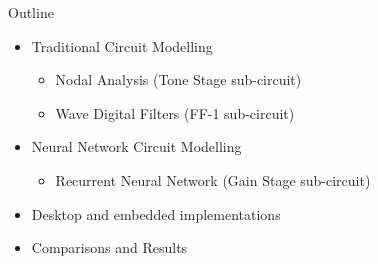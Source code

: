 \begin{frame}{Outline}
    \begin{itemize}
        \item Traditional Circuit Modelling
        \begin{itemize}
            \itemsep0em
            \item Nodal Analysis (Tone Stage sub-circuit)
            \item Wave Digital Filters (FF-1 sub-circuit)
        \end{itemize}
        \item Neural Network Circuit Modelling
        \begin{itemize}
            \itemsep0em
            \item Recurrent Neural Network (Gain Stage sub-circuit)
        \end{itemize}
        \item Desktop and embedded implementations
        \item Comparisons and Results
    \end{itemize}
\end{frame}
